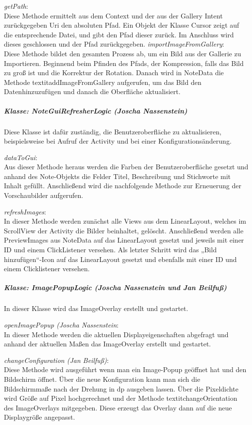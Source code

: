 \textit{getPath}:\\
Diese Methode ermittelt aus dem Context und der aus der Gallery Intent zurückgegeben Uri den absoluten Pfad. Ein Objekt der Klasse Cursor zeigt auf die entsprechende Datei, und gibt den Pfad dieser zurück. Im Anschluss wird dieses geschlossen und der Pfad zurückgegeben.
\textit{importImageFromGallery}:\\
Diese Methode bildet den gesamten Prozess ab, um ein Bild aus der Gallerie zu Importieren. Beginnend beim Pfinden des Pfads, der Kompression, falls das Bild zu groß ist und die Korrektur der Rotation. Danach wird in NoteData die Methode textit{addImageFromGallery} aufgerufen, um das Bild den Datenhinzuzufügen und danach die Oberfläche aktualisiert.

\subparagraph{Klasse: NoteGuiRefresherLogic (Joscha Nassenstein)}
Diese Klasse ist dafür zuständig, die Benutzeroberfläche zu aktualisieren, beispielsweise bei Aufruf der Activity und bei einer Konfigurationsänderung.

\textit{dataToGui}:\\
Aus dieser Methode heraus werden die Farben der Benutzeroberfläche gesetzt und anhand des Note-Objekts die Felder Titel, Beschreibung und Stichworte mit Inhalt gefüllt. Anschließend wird die nachfolgende Methode zur Erneuerung der Vorschaubilder aufgerufen.

\textit{refreshImages}:\\
In dieser Methode werden zunächst alle Views aus dem LinearLayout, welches im ScrollView der Activity die Bilder beinhaltet, gelöscht. Anschließend werden alle PreviewImages aus NoteData auf das LinearLayout gesetzt und jeweils mit einer ID und einem ClickListener versehen. Als letzter Schritt wird das „Bild hinzufügen“-Icon auf das LinearLayout gesetzt und ebenfalls mit einer ID und einem Clicklistener versehen.

\subparagraph{Klasse: ImagePopupLogic (Joscha Nassenstein und Jan Beilfuß)}
In dieser Klasse wird das ImageOverlay erstellt und gestartet.

\textit{openImagePopup (Joscha Nassenstein}:\\
In dieser Methode werden die aktuellen Displayeigenschaften abgefragt und anhand der aktuellen Maßen das ImageOverlay erstellt und gestartet.

\textit{changeConfiguration (Jan Beilfuß)}:\\

Diese Methode wird ausgeführt wenn man ein Image-Popup geöffnet hat und den Bildschirm öffnet. Über die neue Konfiguration kann man sich die Bildschirmmaße nach der Drehung in dp ausgeben lassen. Über die Pixeldichte wird Größe auf Pixel hochgerechnet und der Methode textit{changeOrientation} des ImageOverlays mitgegeben. Diese erzeugt das Overlay dann auf die neue Displaygröße angepasst.

